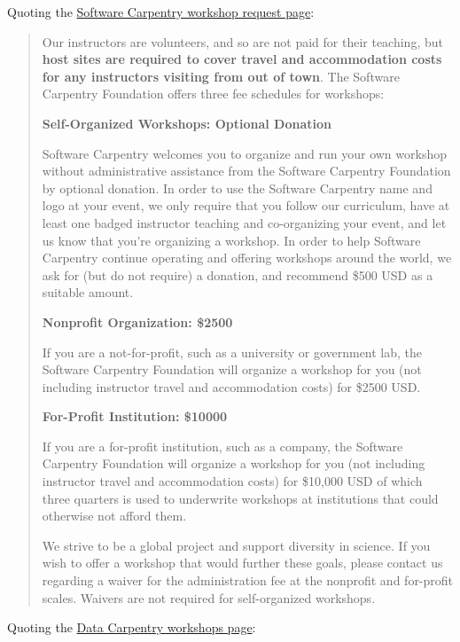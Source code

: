 
Quoting the \href{http://software-carpentry.org/workshops/request/}{Software
Carpentry workshop request page}:

\begin{quote}
Our instructors are volunteers, and so are not paid for their teaching,
but \textbf{host sites are required to cover travel and accommodation
costs for any instructors visiting from out of town}. The Software
Carpentry Foundation offers three fee schedules for workshops:

\textbf{Self-Organized Workshops: Optional Donation}

Software Carpentry welcomes you to organize and run your own workshop
without administrative assistance from the Software Carpentry Foundation
by optional donation. In order to use the Software Carpentry name and
logo at your event, we only require that you follow our curriculum, have
at least one badged instructor teaching and co-organizing your event,
and let us know that you're organizing a workshop. In order to help
Software Carpentry continue operating and offering workshops around the
world, we ask for (but do not require) a donation, and recommend \$500
USD as a suitable amount.

\textbf{Nonprofit Organization: \$2500}

If you are a not-for-profit, such as a university or government lab, the
Software Carpentry Foundation will organize a workshop for you (not
including instructor travel and accommodation costs) for \$2500 USD.

\textbf{For-Profit Institution: \$10000}

If you are a for-profit institution, such as a company, the Software
Carpentry Foundation will organize a workshop for you (not including
instructor travel and accommodation costs) for \$10,000 USD of which
three quarters is used to underwrite workshops at institutions that
could otherwise not afford them.

We strive to be a global project and support diversity in science. If
you wish to offer a workshop that would further these goals, please
contact us regarding a waiver for the administration fee at the
nonprofit and for-profit scales. Waivers are not required for
self-organized workshops.
\end{quote}

Quoting the \href{http://datacarpentry.org/workshops-host/}{Data
Carpentry workshops page}:

